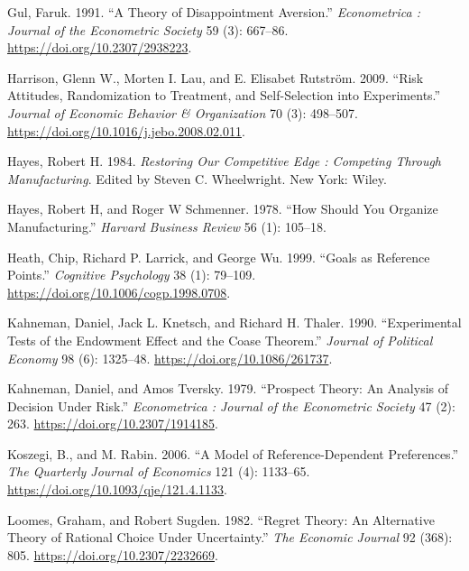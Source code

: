 \documentclass[
  12,
  letterpaper,
  DIV=11,
  numbers=noendperiod]{scrartcl}
\newlength{\cslhangindent}
\newenvironment{CSLReferences}[2] %
 {\begin{list}{}{%
  \setlength{\itemindent}{0pt}
  \setlength{\leftmargin}{0pt}
  \setlength{\parsep}{0pt}
  \ifodd #1
   \setlength{\leftmargin}{\cslhangindent}
   \setlength{\itemindent}{-1\cslhangindent}
  \fi
  \setlength{\itemsep}{#2\baselineskip}}}
 {\end{list}}
\begin{document}
\begin{CSLReferences}{1}{0}
Gul, Faruk. 1991. {``A {Theory} of {Disappointment Aversion}.''}
\emph{Econometrica : Journal of the Econometric Society} 59 (3):
667--86. \url{https://doi.org/10.2307/2938223}.

Harrison, Glenn W., Morten I. Lau, and E. Elisabet Rutström. 2009.
{``Risk Attitudes, Randomization to Treatment, and Self-Selection into
Experiments.''} \emph{Journal of Economic Behavior \& Organization} 70
(3): 498--507. \url{https://doi.org/10.1016/j.jebo.2008.02.011}.

Hayes, Robert H. 1984. \emph{Restoring Our Competitive Edge :
{Competing} Through Manufacturing}. Edited by Steven C. Wheelwright. New
York: Wiley.

Hayes, Robert H, and Roger W Schmenner. 1978. {``How Should You Organize
Manufacturing.''} \emph{Harvard Business Review} 56 (1): 105--18.

Heath, Chip, Richard P. Larrick, and George Wu. 1999. {``Goals as
{Reference Points}.''} \emph{Cognitive Psychology} 38 (1): 79--109.
\url{https://doi.org/10.1006/cogp.1998.0708}.

Kahneman, Daniel, Jack L. Knetsch, and Richard H. Thaler. 1990.
{``Experimental {Tests} of the {Endowment Effect} and the {Coase
Theorem}.''} \emph{Journal of Political Economy} 98 (6): 1325--48.
\url{https://doi.org/10.1086/261737}.

Kahneman, Daniel, and Amos Tversky. 1979. {``Prospect {Theory}: {An
Analysis} of {Decision} Under {Risk}.''} \emph{Econometrica : Journal of
the Econometric Society} 47 (2): 263.
\url{https://doi.org/10.2307/1914185}.

Koszegi, B., and M. Rabin. 2006. {``A {Model} of {Reference-Dependent
Preferences}.''} \emph{The Quarterly Journal of Economics} 121 (4):
1133--65. \url{https://doi.org/10.1093/qje/121.4.1133}.

Loomes, Graham, and Robert Sugden. 1982. {``Regret {Theory}: {An
Alternative Theory} of {Rational Choice Under Uncertainty}.''} \emph{The
Economic Journal} 92 (368): 805. \url{https://doi.org/10.2307/2232669}.


\end{CSLReferences}
\end{document}
